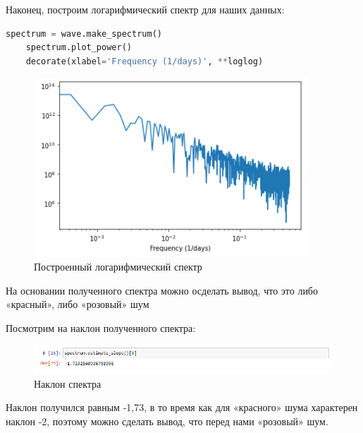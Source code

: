 \documentclass[a4paper]{article}
\begin{document}
            Наконец, построим логарифмический спектр для наших данных:
            
\begin{lstlisting}[language=Python, caption= Построение логарифмического спектра]
    spectrum = wave.make_spectrum()
    spectrum.plot_power()
    decorate(xlabel='Frequency (1/days)', **loglog)
\end{lstlisting}               
            
            \begin{figure}[H]
                \centering
                \includegraphics{ex_3_bitcoin_log_spectr.png}
                \caption{Построенный логарифмический спектр}
                \label{fig:ex_3_bitcoin_log_spectr}
            \end{figure}
            
            На основании полученного спектра можно осделать вывод, что это либо «красный», либо «розовый» шум
            
            Посмотрим на наклон полученного спектра:
            
            \begin{figure}[H]
                \centering
                \includegraphics[width=\textwidth]{ex_3_bitcoin_extimate_slope.png}
                \caption{Наклон спектра}
                \label{fig:ex_3_bitcoin_extimate_slope}
            \end{figure}
            
            Наклон получился равным -1,73, в то время как для «красного» шума характерен наклон -2, поэтому можно сделать вывод, что перед нами «розовый» шум.
            
    \newpage
\end{document}
